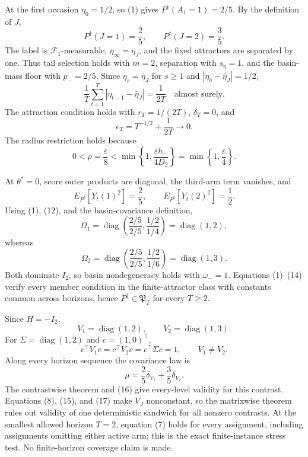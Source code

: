 At the first occasion \(\eta_0=1/2\), so (1) gives \(P^\dagger(A_1=1)=2/5\). By the definition of \(J\),
\[
 P^\dagger(J=1)=\frac25,
 \qquad P^\dagger(J=2)=\frac35.
\tag{8}
\]
The label is \(\mathcal F_1\)-measurable, \(\eta_\infty=\bar\eta_J\), and the fixed attractors are separated by one. Thus tail selection holds with \(m=2\), separation with \(s_\eta=1\), and the basin-mass floor with \(p_-=2/5\). Since \(\eta_s=\bar\eta_J\) for \(s\ge1\) and \(|\eta_0-\bar\eta_J|=1/2\),
\[
 \frac1T\sum_{t=1}^T|\eta_{t-1}-\bar\eta_J|=\frac1{2T}
 \quad\text{almost surely}.
\tag{9}
\]
The attraction condition holds with \(r_T=1/(2T)\), \(\delta_T=0\), and
\[
 e_T=T^{-1/2}+\frac1{2T}\longrightarrow0.
\tag{10}
\]
The radius restriction holds because
\[
 0<\rho=\frac\varepsilon8
 <\min\left\{1,\frac{\varepsilon h_-}{4D_2}\right\}
 =\min\left\{1,\frac\varepsilon4\right\}.
\tag{11}
\]

At \(\theta^*=0\), score outer products are diagonal, the third-arm term vanishes, and
\[
 E_{P^\dagger}[Y_t(1)^2]=\frac25,
 \qquad E_{P^\dagger}[Y_t(2)^2]=\frac12.
\tag{12}
\]
Using (1), (12), and the basin-covariance definition,
\[
 \Omega_1=\operatorname{diag}\left(\frac{2/5}{2/5},
 \frac{1/2}{1/4}\right)=\operatorname{diag}(1,2),
\tag{13}
\]
whereas
\[
 \Omega_2=\operatorname{diag}\left(\frac{2/5}{2/5},
 \frac{1/2}{1/6}\right)=\operatorname{diag}(1,3).
\tag{14}
\]
Both dominate \(I_2\), so basin nondegeneracy holds with \(\omega_-=1\). Equations (1)--(14) verify every member condition in the finite-attractor class with constants common across horizons, hence \(P^\dagger\in\mathfrak P_T\) for every \(T\ge2\).

Since \(H=-I_2\),
\[
 V_1=\operatorname{diag}(1,2),
 \qquad V_2=\operatorname{diag}(1,3).
\tag{15}
\]
For \(\Sigma=\operatorname{diag}(1,2)\) and \(c=(1,0)^\top\),
\[
 c^\top V_1c=c^\top V_2c=c^\top\Sigma c=1,
 \qquad V_1\ne V_2.
\tag{16}
\]
Along every horizon sequence the covariance law is
\[
 \mu=\frac25\delta_{V_1}+\frac35\delta_{V_2}.
\tag{17}
\]
The contrastwise theorem and (16) give every-level validity for this contrast. Equations (8), (15), and (17) make \(V_J\) nonconstant, so the matrixwise theorem rules out validity of one deterministic sandwich for all nonzero contrasts. At the smallest allowed horizon \(T=2\), equation (7) holds for every assignment, including assignments omitting either active arm; this is the exact finite-instance stress test. No finite-horizon coverage claim is made.